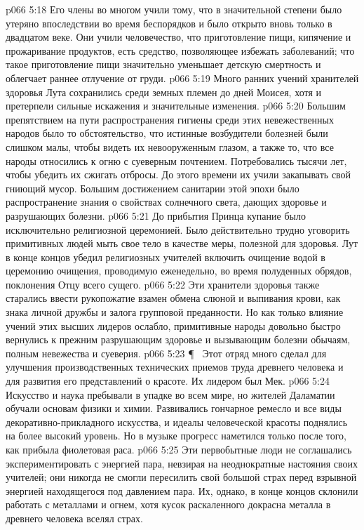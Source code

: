 \vs p066 5:18 Его члены во многом учили тому, что в значительной степени было утеряно впоследствии во время беспорядков и было открыто вновь только в двадцатом веке. Они учили человечество, что приготовление пищи, кипячение и прожаривание продуктов, есть средство, позволяющее избежать заболеваний; что такое приготовление пищи значительно уменьшает детскую смертность и облегчает раннее отлучение от груди.
\vs p066 5:19 Много ранних учений хранителей здоровья Лута сохранились среди земных племен до дней Моисея, хотя и претерпели сильные искажения и значительные изменения.
\vs p066 5:20 Большим препятствием на пути распространения гигиены среди этих невежественных народов было то обстоятельство, что истинные возбудители болезней были слишком малы, чтобы видеть их невооруженным глазом, а также то, что все народы относились к огню с суеверным почтением. Потребовались тысячи лет, чтобы убедить их сжигать отбросы. До этого времени их учили закапывать свой гниющий мусор. Большим достижением санитарии этой эпохи было распространение знания о свойствах солнечного света, дающих здоровье и разрушающих болезни.
\vs p066 5:21 До прибытия Принца купание было исключительно религиозной церемонией. Было действительно трудно уговорить примитивных людей мыть свое тело в качестве меры, полезной для здоровья. Лут в конце концов убедил религиозных учителей включить очищение водой в церемонию очищения, проводимую еженедельно, во время полуденных обрядов, поклонения Отцу всего сущего.
\vs p066 5:22 Эти хранители здоровья также старались ввести рукопожатие взамен обмена слюной и выпивания крови, как знака личной дружбы и залога групповой преданности. Но как только влияние учений этих высших лидеров ослабло, примитивные народы довольно быстро вернулись к прежним разрушающим здоровье и вызывающим болезни обычаям, полным невежества и суеверия.
\vs p066 5:23 \P\ \bibnobreakspace {} Этот отряд много сделал для улучшения производственных технических приемов труда древнего человека и для развития его представлений о красоте. Их лидером был Мек.
\vs p066 5:24 Искусство и наука пребывали в упадке во всем мире, но жителей Даламатии обучали основам физики и химии. Развивались гончарное ремесло и все виды декоративно\hyp{}прикладного искусства, и идеалы человеческой красоты поднялись на более высокий уровень. Но в музыке прогресс наметился только после того, как прибыла фиолетовая раса.
\vs p066 5:25 Эти первобытные люди не соглашались экспериментировать с энергией пара, невзирая на неоднократные настояния своих учителей; они никогда не смогли пересилить свой большой страх перед взрывной энергией находящегося под давлением пара. Их, однако, в конце концов склонили работать с металлами и огнем, хотя кусок раскаленного докрасна металла в древнего человека вселял страх.
